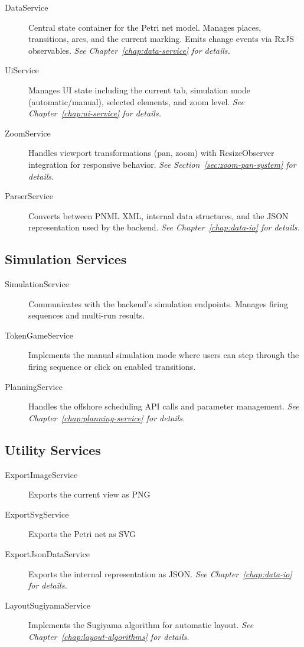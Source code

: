 \begin{description}
    \item[DataService] Central state container for the Petri net model. Manages places, transitions, arcs, and the current marking. Emits change events via RxJS observables. \textit{See Chapter~\ref{chap:data-service} for details.}
    
    \item[UiService] Manages UI state including the current tab, simulation mode (automatic/manual), selected elements, and zoom level. \textit{See Chapter~\ref{chap:ui-service} for details.}
    
    \item[ZoomService] Handles viewport transformations (pan, zoom) with ResizeObserver integration for responsive behavior. \textit{See Section~\ref{sec:zoom-pan-system} for details.}
    
    \item[ParserService] Converts between PNML XML, internal data structures, and the JSON representation used by the backend. \textit{See Chapter~\ref{chap:data-io} for details.}
\end{description}

\subsection{Simulation Services}

\begin{description}
    \item[SimulationService] Communicates with the backend's simulation endpoints. Manages firing sequences and multi-run results.
    
    \item[TokenGameService] Implements the manual simulation mode where users can step through the firing sequence or click on enabled transitions.
    
    \item[PlanningService] Handles the offshore scheduling API calls and parameter management. \textit{See Chapter~\ref{chap:planning-service} for details.}
\end{description}

\subsection{Utility Services}

\begin{description}
    \item[ExportImageService] Exports the current view as PNG
    \item[ExportSvgService] Exports the Petri net as SVG
    \item[ExportJsonDataService] Exports the internal representation as JSON. \textit{See Chapter~\ref{chap:data-io} for details.}
    \item[LayoutSugiyamaService] Implements the Sugiyama algorithm for automatic layout. \textit{See Chapter~\ref{chap:layout-algorithms} for details.}
\end{description}

